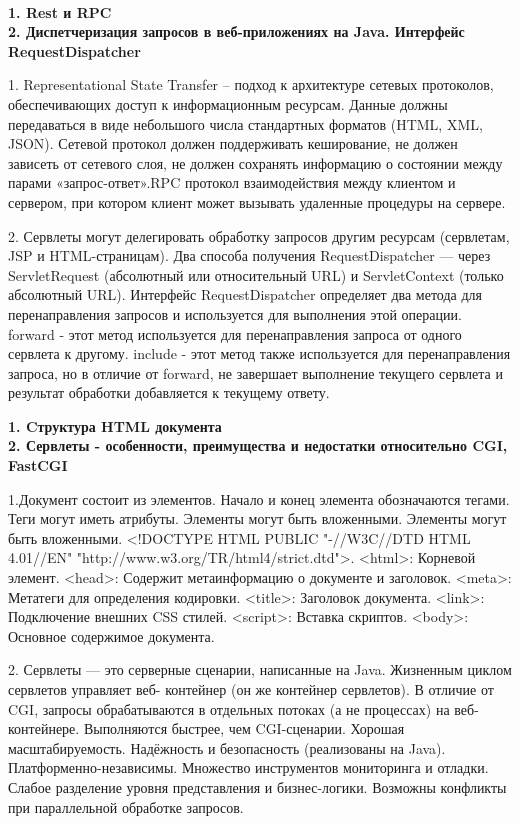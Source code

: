 \documentclass{article}
\begin{document}
\\
\begin{minipage}{.3\textwidth}
    \textbf{1. Rest и RPC}\\
    \textbf{2. Диспетчеризация запросов в веб-приложениях на Java. Интерфейс RequestDispatcher}

1. Representational State Transfer – подход к архитектуре сетевых протоколов, обеспечивающих доступ к информационным ресурсам.
Данные должны передаваться в виде небольшого числа стандартных форматов (HTML, XML, JSON). Сетевой протокол должен поддерживать кеширование, не должен зависеть от сетевого слоя, не должен сохранять информацию о состоянии между парами «запрос-ответ».RPC протокол взаимодействия между клиентом и сервером, при котором клиент может вызывать удаленные процедуры на сервере.

2. Сервлеты могут делегировать обработку запросов другим ресурсам (сервлетам, JSP и HTML-страницам). Два способа получения RequestDispatcher — через ServletRequest (абсолютный или относительный URL) и ServletContext (только абсолютный URL). Интерфейс RequestDispatcher определяет два метода для перенаправления запросов и используется для выполнения этой операции.
forward -  этот метод используется для перенаправления запроса от одного сервлета к другому. include - этот метод также используется для перенаправления запроса, но в отличие от forward, не завершает выполнение текущего сервлета и результат обработки добавляется к текущему ответу.
\end{minipage}
\hfill
\begin{minipage}{.3\textwidth}
    \textbf{1. Cтруктура HTML документа}\\
    \textbf{2. Сервлеты - особенности, преимущества и недостатки относительно CGI, FastCGI}

1.Документ состоит из элементов. Начало и конец элемента обозначаются тегами. Теги могут иметь атрибуты. Элементы могут быть вложенными. 
Элементы могут быть вложенными. <!DOCTYPE HTML PUBLIC "-//W3C//DTD HTML 4.01//EN"
"http://www.w3.org/TR/html4/strict.dtd">. <html>: Корневой элемент.
<head>: Содержит метаинформацию о документе и заголовок. <meta>: Метатеги для определения кодировки. <title>: Заголовок документа.
<link>: Подключение внешних CSS стилей. <script>: Вставка скриптов.
<body>: Основное содержимое документа.

2. Сервлеты — это серверные сценарии, написанные на Java. Жизненным циклом сервлетов управляет веб- контейнер (он же контейнер сервлетов). В отличие от CGI, запросы обрабатываются в отдельных потоках (а не процессах) на веб- контейнере.
Выполняются быстрее, чем CGI-сценарии. Хорошая масштабируемость. Надёжность и безопасность (реализованы на Java). Платформенно-независимы. Множество инструментов мониторинга и отладки.
Слабое разделение уровня представления и бизнес-логики. Возможны конфликты при параллельной обработке запросов.
\end{minipage}
\end{document}
